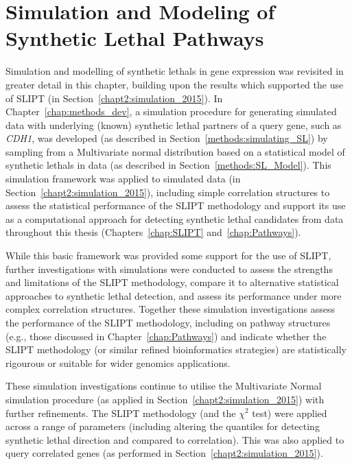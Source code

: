 \chapter{Simulation and Modeling of Synthetic Lethal Pathways}
\label{chap:simulation}

Simulation and modelling of \glspl{synthetic lethal} in \gls{gene expression} was revisited in greater detail in this chapter, building upon the results which supported the use of \gls{SLIPT} (in Section~\ref{chapt2:simulation_2015}). In Chapter~\ref{chap:methods_dev}, a simulation procedure for generating simulated data with underlying (known) \gls{synthetic lethal} partners of a query gene, such as \textit{CDH1}, was developed (as described in Section~\ref{methods:simulating_SL}) by sampling from a Multivariate normal distribution based on a statistical model of \glspl{synthetic lethal} in  data (as described in Section~\ref{methods:SL_Model}). This simulation framework was applied to simulated data (in Section~\ref{chapt2:simulation_2015}), including simple correlation structures to assess the statistical performance of the \gls{SLIPT} methodology and support its use as a computational approach for detecting \gls{synthetic lethal} candidates from  data throughout this thesis (Chapters~\ref{chap:SLIPT} and~\ref{chap:Pathways}). 

While this basic framework was provided some support for the use of \gls{SLIPT}, further investigations with simulations were conducted to assess the strengths and limitations of the \gls{SLIPT} methodology, compare it to alternative statistical approaches to \gls{synthetic lethal} detection, and assess its performance under more complex correlation structures. Together these simulation investigations assess the performance of the \gls{SLIPT} methodology, including on pathway  structures (e.g., those discussed in Chapter~\ref{chap:Pathways}) and indicate whether the \gls{SLIPT} methodology (or similar refined \gls{bioinformatics} strategies) are statistically rigourous or suitable for wider \glspl{genomic} applications.

These simulation investigations continue to utilise the Multivariate Normal simulation procedure (as applied in Section~\ref{chapt2:simulation_2015}) with further refinements. The \gls{SLIPT} methodology (and the $\chi^2$ test) were applied across a range of parameters (including altering the quantiles for detecting \gls{synthetic lethal} direction and compared to correlation). This was also applied to query correlated genes (as performed in Section~\ref{chapt2:simulation_2015}).

